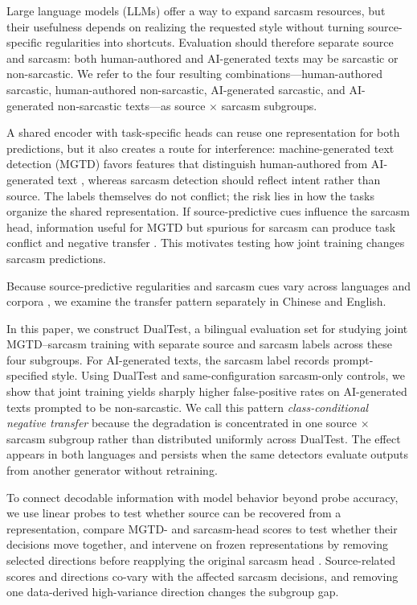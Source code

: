 \documentclass[11pt]{article}
\begin{document}
Large language models (LLMs) offer a way to expand sarcasm resources, but their usefulness depends on realizing the requested style without turning source-specific regularities into shortcuts. Evaluation should therefore separate source and sarcasm: both human-authored and AI-generated texts may be sarcastic or non-sarcastic. We refer to the four resulting combinations---human-authored sarcastic, human-authored non-sarcastic, AI-generated sarcastic, and AI-generated non-sarcastic texts---as source $\times$ sarcasm subgroups.

A shared encoder with task-specific heads can reuse one representation for both predictions, but it also creates a route for interference: machine-generated text detection (MGTD) favors features that distinguish human-authored from AI-generated text \citep{guo2023hc3,wang2024m4}, whereas sarcasm detection should reflect intent rather than source. The labels themselves do not conflict; the risk lies in how the tasks organize the shared representation. If source-predictive cues influence the sarcasm head, information useful for MGTD but spurious for sarcasm can produce task conflict and negative transfer \citep{mueller2022taskconflict,hu2022spurious}. This motivates testing how joint training changes sarcasm predictions.

Because source-predictive regularities and sarcasm cues vary across languages and corpora \citep{jang2024csc,casola2024multipico,wang2024m4}, we examine the transfer pattern separately in Chinese and English.

In this paper, we construct DualTest, a bilingual evaluation set for studying joint MGTD--sarcasm training with separate source and sarcasm labels across these four subgroups. For AI-generated texts, the sarcasm label records prompt-specified style. Using DualTest and same-configuration sarcasm-only controls, we show that joint training yields sharply higher false-positive rates on AI-generated texts prompted to be non-sarcastic. We call this pattern \emph{class-conditional negative transfer} because the degradation is concentrated in one source $\times$ sarcasm subgroup rather than distributed uniformly across DualTest. The effect appears in both languages and persists when the same detectors evaluate outputs from another generator without retraining.

To connect decodable information with model behavior beyond probe accuracy, we use linear probes to test whether source can be recovered from a representation, compare MGTD- and sarcasm-head scores to test whether their decisions move together, and intervene on frozen representations by removing selected directions before reapplying the original sarcasm head \citep{hewitt2019probes,elazar2021amnesic}. Source-related scores and directions co-vary with the affected sarcasm decisions, and removing one data-derived high-variance direction changes the subgroup gap.
\end{document}
